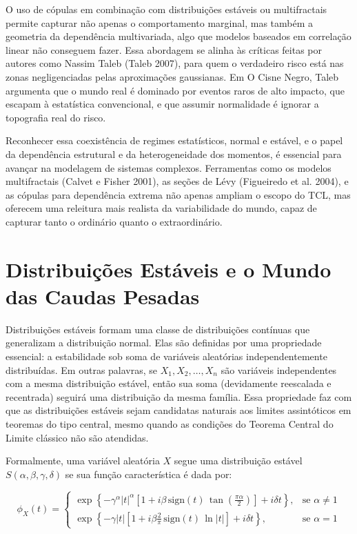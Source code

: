 \documentclass[
  letterpaper,
  DIV=11,
  numbers=noendperiod]{scrartcl}
\begin{document}
O uso de cópulas em combinação com distribuições estáveis ou
multifractais permite capturar não apenas o comportamento marginal, mas
também a geometria da dependência multivariada, algo que modelos
baseados em correlação linear não conseguem fazer. Essa abordagem se
alinha às críticas feitas por autores como Nassim Taleb (Taleb 2007),
para quem o verdadeiro risco está nas zonas negligenciadas pelas
aproximações gaussianas. Em O Cisne Negro, Taleb argumenta que o mundo
real é dominado por eventos raros de alto impacto, que escapam à
estatística convencional, e que assumir normalidade é ignorar a
topografia real do risco.

Reconhecer essa coexistência de regimes estatísticos, normal e estável,
e o papel da dependência estrutural e da heterogeneidade dos momentos, é
essencial para avançar na modelagem de sistemas complexos. Ferramentas
como os modelos multifractais (Calvet e Fisher 2001), as seções de Lévy
(Figueiredo et al. 2004), e as cópulas para dependência extrema não
apenas ampliam o escopo do TCL, mas oferecem uma releitura mais realista
da variabilidade do mundo, capaz de capturar tanto o ordinário quanto o
extraordinário.

\section{Distribuições Estáveis e o Mundo das Caudas
Pesadas}\label{distribuiuxe7uxf5es-estuxe1veis-e-o-mundo-das-caudas-pesadas}

Distribuições estáveis formam uma classe de distribuições contínuas que
generalizam a distribuição normal. Elas são definidas por uma
propriedade essencial: a estabilidade sob soma de variáveis aleatórias
independentemente distribuídas. Em outras palavras, se
\(X_1, X_2, \dots, X_n\) são variáveis independentes com a mesma
distribuição estável, então sua soma (devidamente reescalada e
recentrada) seguirá uma distribuição da mesma família. Essa propriedade
faz com que as distribuições estáveis sejam candidatas naturais aos
limites assintóticos em teoremas do tipo central, mesmo quando as
condições do Teorema Central do Limite clássico não são atendidas.

Formalmente, uma variável aleatória \(X\) segue uma distribuição estável
\(S(\alpha, \beta, \gamma, \delta)\) se sua função característica é dada
por:

\[
\phi_X(t) = 
\begin{cases}
\exp\left\{ -\gamma^\alpha |t|^\alpha \left[1 + i \beta \, \text{sign}(t) \, \tan\left(\frac{\pi \alpha}{2}\right)\right] + i\delta t \right\}, & \text{se } \alpha \neq 1 \\
\exp\left\{ -\gamma |t| \left[1 + i \beta \frac{2}{\pi} \, \text{sign}(t) \, \ln|t|\right] + i\delta t \right\}, & \text{se } \alpha = 1
\end{cases}
\]
\end{document}
